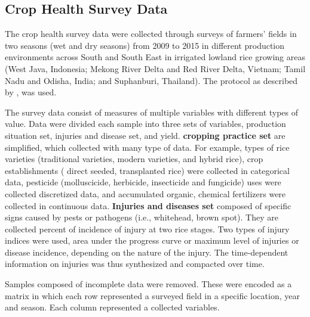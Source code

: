 \subsection*{Crop Health Survey Data}


The crop health survey data were collected through surveys of farmers' fields in two seasons (wet and dry seasons) from 2009 to 2015 in different production environments across South and South East in irrigated lowland rice growing areas (West Java, Indonesia; Mekong River Delta and Red River Delta, Vietnam; Tamil Nadu and Odisha, India; and Suphanburi, Thailand). The protocol as described by , was used. %

The survey data consist of measures of multiple variables with different types of value. Data were divided each sample into three sets of variables, production situation set, injuries and disease set, and yield. \textbf{cropping practice set} are simplified, which collected with many type of data. For example, types of rice varieties (traditional varieties, modern varieties, and hybrid rice), crop establishments ( direct seeded, transplanted rice) were collected in categorical data, pesticide (molluscicide, herbicide, insecticide and fungicide) uses were collected discretized data, and accumulated organic, chemical fertilizers were collected in continuous data. \textbf{Injuries and diseases set} composed of specific signs caused by pests or pathogens (i.e., whitehead, brown spot). They are collected percent of incidence of injury at two rice stages. Two types of injury indices were used, area under the progress curve or maximum level of injuries or disease incidence, depending on the nature of the injury. The time-dependent information on injuries was thus synthesized and compacted over time.

Samples composed of incomplete data were removed. These were encoded as a matrix in which each row represented a surveyed field in a specific location, year and season. Each column represented a collected variables.

